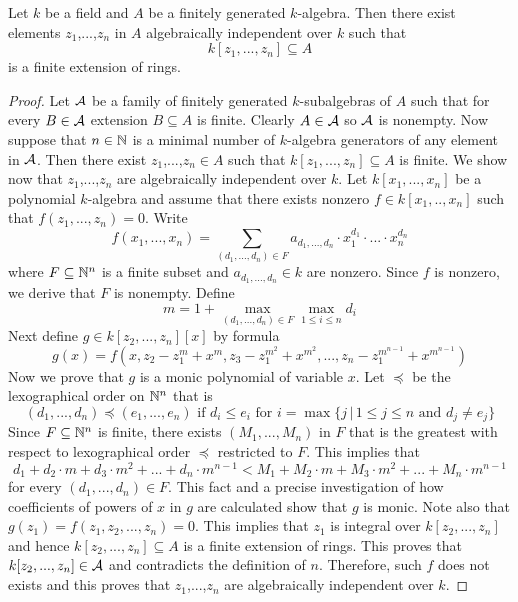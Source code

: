 \begin{theorem}\label{theorem:noethernormalizationlemma}
Let $k$ be a field and $A$ be a finitely generated $k$-algebra. Then there exist elements $z_1$,...,$z_n$ in $A$ algebraically independent over $k$ such that 
$$k[z_1,...,z_n]\subseteq A$$
is a finite extension of rings.
\end{theorem}
\begin{proof}
Let ${\mathcal A}$ be a family of finitely generated $k$-subalgebras of $A$ such that for every $B \in {\mathcal A}$ extension $B \subseteq A$ is finite. Clearly $A\in {\mathcal A}$ so ${\mathcal A}$ is nonempty. Now suppose that $n\in {\mathbb N}$ is a minimal number of $k$-algebra generators of any element in ${\mathcal A}$. Then there exist $z_1$,...,$z_n\in A$ such that $k[z_1,...,z_n]\subseteq A$ is finite. We show now that $z_1$,...,$z_n$ are algebraically independent over $k$. Let $k[x_1,...,x_n]$ be a polynomial $k$-algebra and assume that there exists nonzero $f\in k[x_1,..,x_n]$ such that $f(z_1,...,z_n)=0$. Write 
$$f(x_1,...,x_n) = \sum_{(d_1,...,d_n)\in F}a_{d_1,...,d_n}\cdot x_1^{d_1}\cdot...\cdot x_n^{d_n}$$
where $F\subseteq {\mathbb N}^n$ is a finite subset and $a_{d_1,...,d_n}\in k$ are nonzero. Since $f$ is nonzero, we derive that $F$ is nonempty. Define 
$$m = 1+\max_{(d_1,...,d_n)\in F} \max_{1\leq i\leq n}d_i$$
Next define $g\in k[z_2,...,z_n][x]$ by formula 
$$g(x) = f(x,z_2-z_1^m+x^m,z_3-z_1^{m^2}+x^{m^2},...,z_n-z_1^{m^{n-1}}+x^{m^{n-1}})$$ 
Now we prove that $g$ is a monic polynomial of variable $x$. Let $\preceq$ be the lexographical order on ${\mathbb N}^n$ that is
$$(d_1,...,d_n)\preceq (e_1,...,e_n)\mbox{ if }d_i\leq e_i\mbox{ for }i = \max \big\{j\,\big|\,1\leq j\leq n\mbox{ and }d_j\neq e_j\big\}$$
Since $F\subseteq {\mathbb N}^n$ is finite, there exists $(M_1,...,M_n)$ in $F$ that is the greatest with respect to lexographical order $\preceq$ restricted to $F$. This implies that
$$d_1+d_2\cdot m+d_3\cdot m^2+...+d_n\cdot m^{n-1} < M_1+M_2\cdot m+M_3\cdot m^2+...+M_n\cdot m^{n-1}$$
for every $(d_1,...,d_n)\in F$. This fact and a precise investigation of how coefficients of powers of $x$ in $g$ are calculated show that $g$ is monic. Note also that $g(z_1) = f(z_1,z_2,...,z_n)=0$. This implies that $z_1$ is integral over $k[z_2,...,z_n]$ and hence $k[z_2,...,z_n]\subseteq A$ is a finite extension of rings. This proves that $k[z_2,...,z_n]\in {\mathcal A}$ and contradicts the definition of $n$. Therefore, such $f$ does not exists and this proves that $z_1$,...,$z_n$ are algebraically independent over $k$.
\end{proof}

